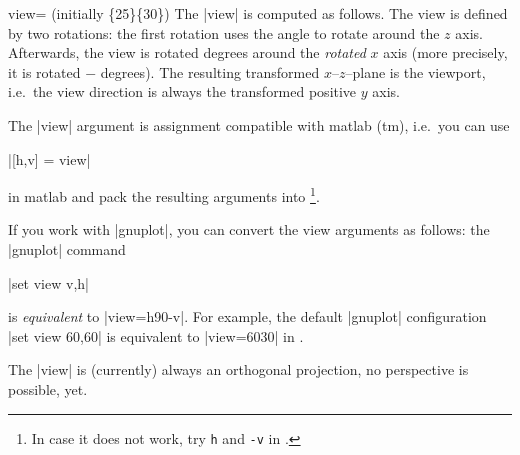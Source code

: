 \begin{pgfplotskey}{view= (initially \{25\}\{30\})}
	The |view| is computed as follows. The view is defined by two rotations: the first rotation uses the  angle to rotate around the $z$ axis. Afterwards, the view is rotated  degrees around the \emph{rotated} $x$ axis (more precisely, it is rotated $-$ degrees). The resulting transformed $x$--$z$--plane is the viewport, i.e.\ the view direction is always the transformed positive $y$ axis.

	The |view| argument is assignment compatible with matlab (tm), i.e.\ you can use 
	
	|[h,v] = view|
	
	\noindent in matlab and pack the resulting arguments into \PGFPlots\footnote{In case it does not work, try \texttt{h} and \texttt{-v} in \PGFPlots.}.

	If you work with |gnuplot|, you can convert the view arguments as follows: the |gnuplot| command

	|set view v,h|

	\noindent is \emph{equivalent} to |view={h}{90-v}|. For example, the default |gnuplot| configuration |set view 60,60| is equivalent to |view={60}{30}| in \PGFPlots.

	The |view| is (currently) always an orthogonal projection, no perspective is possible, yet.
\end{pgfplotskey}

